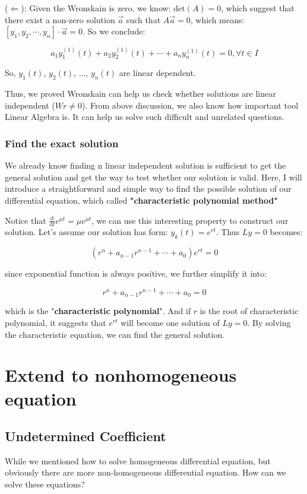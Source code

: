 \documentclass{article}
\begin{document}
($\Leftarrow$): Given the Wronskain is zero, we know: $\mathrm{det}(A) = 0$, which suggest that there exist a non-zero solution $\vec{a}$ such that $A\vec{a} = 0$, which means: $[y_{1}, y_{2}, \cdots, y_{n}] \cdot \vec{a} = 0$. So we conclude:

$$a_{1}y_{1}^{(1)}(t) + a_{2}y_{2}^{(1)}(t) + \cdots + a_{n}y_{n}^{(1)}(t) = 0, \forall t \in I$$

So, $y_{1}(t)$, $y_{2}(t)$, ..., $y_{n}(t)$ are linear dependent.

Thus, we proved Wronskain can help us check whether solutions are linear independent ($Wr \not = 0$). From above discussion, we also know how important tool Linear Algebra is. It can help us solve such difficult and unrelated questions.

\subsubsection{Find the exact solution}

We already know finding n linear independent solution is sufficient to get the general solution and get the way to test whether our solution is valid. Here, I will introduce a straightforward and simple way to find the possible solution of our differential equation, which called \textbf{"characteristic polynomial method"}

Notice that $\frac{\mathrm{d}}{\mathrm{d}t}e^{\mu t} = \mu e^{\mu t}$, we can use this interesting property to construct our solution. Let's assume our solution has form: $y_{k}(t) = e^{rt}$. Thus $Ly = 0$ becomes:

$$(r^{n} + a_{n-1}r^{n-1} + \cdots + a_{0})e^{rt} = 0$$

since exponential function is always positive, we further simplify it into:

$$r^{n} + a_{n-1}r^{n-1} + \cdots + a_{0} = 0$$

which is the "\textbf{characteristic polynomial}". And if $r$ is the root of characteristic polynomial, it suggests that $e^{rt}$ will become one solution of $Ly = 0$. By solving the characteristic equation, we can find the general solution.

\section{Extend to nonhomogeneous equation}
\subsection{Undetermined Coefficient}
While we mentioned how to solve homogeneous differential equation, but obviously there are more non-homogeneous differential equation. How can we solve these equations?
\end{document}
